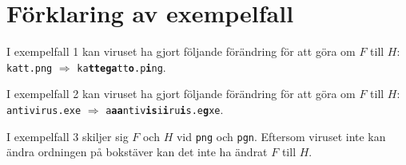 \section*{Förklaring av exempelfall}
I exempelfall 1 kan viruset ha gjort följande förändring för att göra om $F$ till $H$:
\texttt{katt.png} $\Rightarrow$ \texttt{ka\textbf{ttega}tt\textbf{o}.p\textbf{i}ng}.

I exempelfall 2 kan viruset ha gjort följande förändring för att göra om $F$ till $H$:
\texttt{antivirus.exe} $\Rightarrow$ \texttt{a\textbf{aa}ntiv\textbf{is}i\textbf{i}ru\textbf{i}s.e\textbf{g}xe}.

I exempelfall 3 skiljer sig $F$ och $H$ vid \texttt{png} och \texttt{pgn}. Eftersom viruset inte kan ändra ordningen på bokstäver
kan det inte ha ändrat $F$ till $H$. 
